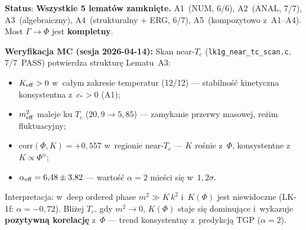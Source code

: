 \medskip\noindent
\textbf{Status}: \textbf{Wszystkie 5 lemat\'ow zamkni\k{e}te.}
A1~(NUM, 6/6), A2~(ANAL, 7/7), A3~(algebraiczny),
A4~(strukturalny + ERG, 6/7), A5~(kompozytowo z~A1--A4).
Most $\Gamma \to \Phi$ jest \textbf{kompletny}.

\medskip\noindent
\textbf{Weryfikacja MC (sesja 2026-04-14):}
Skan near-$T_c$ (\texttt{lk1g\_near\_tc\_scan.c}, 7/7~PASS)
potwierdza strukturę Lematu~A3:
\begin{itemize}[nosep]
  \item $K_{\rm eff} > 0$ w~ca\l{}ym zakresie temperatur (12/12)
    --- stabilno\'s\'c kinetyczna konsystentna z~$c_* > 0$ (A1);
  \item $m_{\rm eff}^2$ maleje ku $T_c$ ($20{,}9 \to 5{,}85$)
    --- zamykanie przerwy masowej, re\.zim fluktuacyjny;
  \item corr$(\Phi, K) = +0{,}557$ w~regionie near-$T_c$
    --- $K$ ro\'snie z~$\Phi$, konsystentne z~$K \propto \Phi^\alpha$;
  \item $\alpha_{\rm eff} = 6{,}48 \pm 3{,}82$
    --- warto\'s\'c $\alpha = 2$ mie\'sci si\k{e} w~$1{,}2\sigma$.
\end{itemize}
Interpretacja: w~deep ordered phase $m^2 \gg K\,k^2$ i~$K(\Phi)$ jest
niewidoczne (LK-1f: $\alpha = -0{,}72$).
Bliżej $T_c$, gdy $m^2 \to 0$, $K(\Phi)$ staje si\k{e} dominuj\k{a}ce
i~wykazuje \textbf{pozytywn\k{a} korelacj\k{e}} z~$\Phi$
--- trend konsystentny z~predykcj\k{a} TGP ($\alpha = 2$).

\bigskip
\begin{center}
\end{center}
